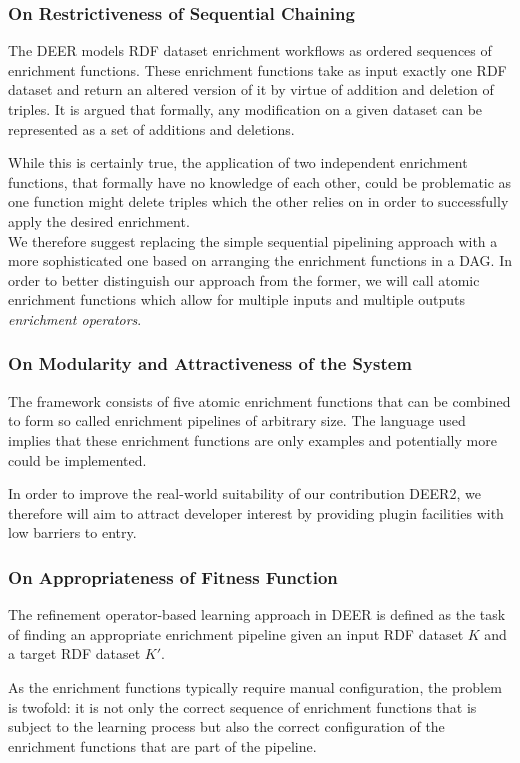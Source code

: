 \subsubsection*{On Restrictiveness of Sequential Chaining}
The \acl{DEER} models \ac{RDF} dataset enrichment workflows as ordered sequences of enrichment functions.
These enrichment functions take as input exactly one \ac{RDF} dataset and return an altered version of it by virtue of addition and deletion of triples.
It is argued that formally, any modification on a given dataset can be represented as a set of additions and deletions.

While this is certainly true, the application of two independent enrichment functions, that formally have no knowledge of each other, could be problematic as one function might delete triples which the other relies on in order to successfully apply the desired enrichment.\\

We therefore suggest replacing the simple sequential pipelining approach with a more sophisticated one based on arranging the enrichment functions in a \ac{DAG}.
In order to better distinguish our approach from the former, we will call atomic enrichment functions which allow for multiple inputs and multiple outputs \emph{enrichment operators}.

\subsubsection*{On Modularity and Attractiveness of the System}
The framework consists of five atomic enrichment functions that can be combined to form so called enrichment pipelines of arbitrary size.
The language used implies that these enrichment functions are only examples and potentially more could be implemented.
 
In order to improve the real-world suitability of our contribution \ac{DEER2}, we therefore will aim to attract developer interest by providing plugin facilities with low barriers to entry.

\subsubsection*{On Appropriateness of Fitness Function}
The refinement operator-based learning approach in \ac{DEER} is defined as the task of finding an appropriate enrichment pipeline given an input \ac{RDF} dataset $K$ and a target \ac{RDF} dataset $K'$.

As the enrichment functions typically require manual configuration, the problem is twofold: it is not only the correct sequence of enrichment functions that is subject to the learning process but also the correct configuration of the enrichment functions that are part of the pipeline.

